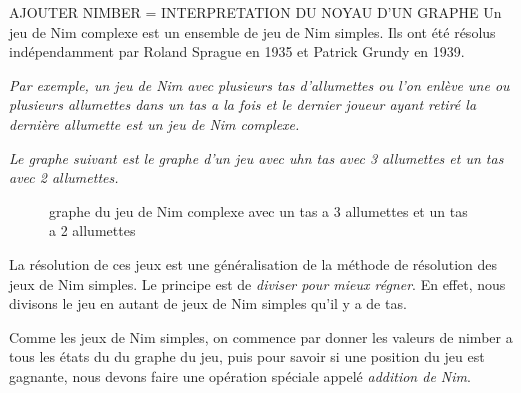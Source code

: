     AJOUTER NIMBER = INTERPRETATION DU NOYAU D'UN GRAPHE
    Un jeu de Nim complexe est un ensemble de jeu de Nim simples. Ils ont été résolus indépendamment par Roland Sprague en 1935 et Patrick Grundy en 1939.

    \textit{
      Par exemple, un jeu de Nim avec plusieurs tas d'allumettes ou l'on enlève une ou plusieurs allumettes dans un tas a la fois et le dernier joueur ayant retiré la dernière allumette est un jeu de Nim complexe.
    }

    \textit{
      Le graphe suivant est le graphe d'un jeu avec uhn tas avec 3 allumettes et un tas avec 2 allumettes.
    }

     \begin{figure}[h]
      \centering
      \caption{graphe du jeu de Nim complexe avec un tas a 3 allumettes et un tas a 2 allumettes}
    \end{figure}

    La résolution de ces jeux est une généralisation de la méthode de résolution des jeux de Nim simples. Le principe est de \textit{diviser pour mieux régner}. En effet, nous divisons le jeu en autant de jeux de Nim simples qu'il y a de tas.

    Comme les jeux de Nim simples, on commence par donner les valeurs de nimber a tous les états du du graphe du jeu, puis pour savoir si une position du jeu est gagnante, nous devons faire une opération spéciale appelé \textit{addition de Nim}.

